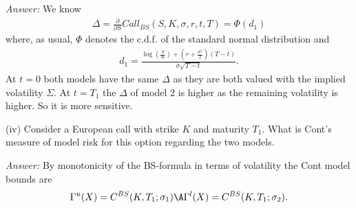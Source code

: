 \documentclass[11pt,a4paper,titlepage]{article}
\begin{document}
{\it Answer:}
We know
\begin{align*}
  \Delta = \frac{\partial}{\partial S}Call_{BS}(S,K,\sigma,r,t,T) = \Phi(d_1)
\end{align*}
where, as usual, $\Phi$ denotes the c.d.f. of the standard normal distribution and
\begin{align*}
  d_1 = \frac{\log \left( \frac{S}{K} \right) + \left( r + \frac{\sigma^2}{2}
  \right)(T-t)}{\sigma \sqrt{T-t}}.
\end{align*}
At $t=0$ both models have the same $\Delta$ as they are both valued with the implied volatility $\Sigma$.
At $t=T_1$ the  $\Delta$ of model 2 is higher as the remaining volatility is higher. So it is more sensitive.

\item[(iv)]
Consider  a  European call with strike $K$ and maturity $T_1$. What is Cont's measure of model risk for this option regarding the two models.

{\it Answer:}
By monotonicity of the BS-formula in terms of volatility the Cont model bounds are
$$
\Gamma^u(X)=C^{BS}(K, T_1; \sigma_1)  \A \Gamma^l(X)=C^{BS}(K, T_1; \sigma_2).$$



\vspace{0.5cm}
\end{document}

